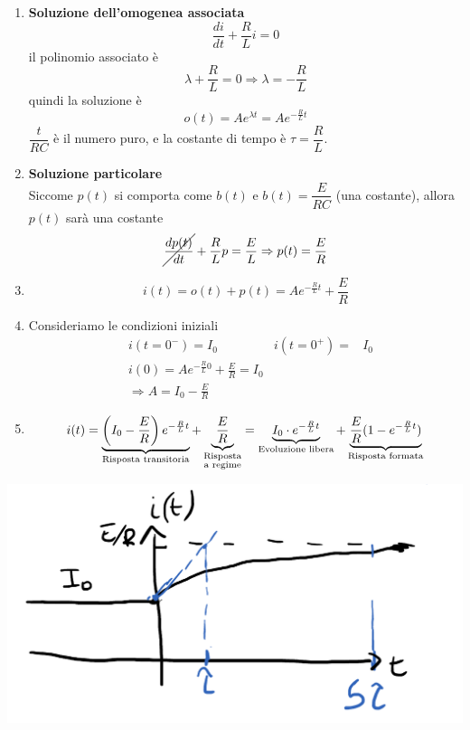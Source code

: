 \documentclass{article}
\begin{document}
\begin{enumerate}
    \item \textbf{Soluzione dell'omogenea associata}
    \[
        \frac{di}{dt} + \frac{R}{L}i = 0
    \]
    il polinomio associato è 
    \[
        \lambda + \frac{R}{L} = 0 \Rightarrow \lambda = -\frac{R}{L}
    \]
    quindi la soluzione è
    \[
        o(t) = A e^{\lambda t} = A e^{-\frac{R}{L}t}
    \]
    $\dfrac{t}{RC}$ è il numero puro, e la costante di tempo è $\tau = \dfrac{R}{L}$.
    \item \textbf{Soluzione particolare}\\
    Siccome $p(t)$ si comporta come $b(t)$ e $b(t)=\dfrac{E}{RC}$ (una costante), allora $p(t)$ sarà una costante
    \[
        \cancel{\frac{dp(t)}{dt}} + \frac{R}{L}p = \frac{E}{L} \Rightarrow p(t) = \frac{E}{R} 
    \]

    \item \[ i(t) = o(t)+p(t) = A e^{-\frac{R}{L}t} + \frac{E}{R}  \] 
    
    \item Consideriamo le condizioni iniziali
    \begin{align*}
        &i(t=0^-) = I_0 & i(t=0^+) = &I_0\\
        &i(0) = A e^{-\frac{R}{L}0} + \frac{E}{R} = I_0\\
        &\Rightarrow A = I_0 - \frac{E}{R}
    \end{align*}

    \item \[ i(t) = \underbrace{\left(I_0-\frac{E}{R}\right)e^{-\frac{R}{L}t}}_{\text{Risposta transitoria}} + \underbrace{\frac{E}{R}}_{\substack{\text{Risposta}\\\text{a regime}}} = \underbrace{I_0 \cdot  e^{-\frac{R}{L}t}}_{\text{Evoluzione libera}} + \underbrace{\frac{E}{R}(1-e^{-\frac{R}{L}t})}_{\text{Risposta formata}} \]
\end{enumerate}
\begin{center}
    \includegraphics[scale=0.25]{Image/RL_3.png}
\end{center}
\end{document}
